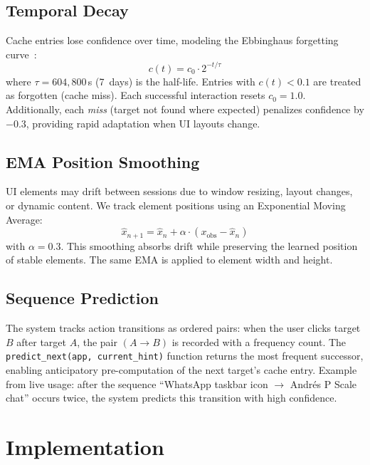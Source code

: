 \documentclass[conference]{IEEEtran}
\begin{document}
\subsection{Temporal Decay}

Cache entries lose confidence over time, modeling the Ebbinghaus forgetting curve~\cite{ebbinghaus1885}:
\begin{equation}
    c(t) = c_0 \cdot 2^{-t / \tau}
    \label{eq:decay}
\end{equation}
where $\tau = 604{,}800$\,s (7~days) is the half-life. Entries with $c(t) < 0.1$ are treated as forgotten (cache miss). Each successful interaction resets $c_0 = 1.0$. Additionally, each \emph{miss} (target not found where expected) penalizes confidence by $-0.3$, providing rapid adaptation when UI layouts change.

\subsection{EMA Position Smoothing}

UI elements may drift between sessions due to window resizing, layout changes, or dynamic content. We track element positions using an Exponential Moving Average:
\begin{equation}
    \hat{x}_{n+1} = \hat{x}_n + \alpha \cdot (x_{\text{obs}} - \hat{x}_n)
    \label{eq:ema}
\end{equation}
with $\alpha = 0.3$. This smoothing absorbs drift while preserving the learned position of stable elements. The same EMA is applied to element width and height.

\subsection{Sequence Prediction}

The system tracks action transitions as ordered pairs: when the user clicks target $B$ after target $A$, the pair $(A \to B)$ is recorded with a frequency count. The \texttt{predict\_next(app, current\_hint)} function returns the most frequent successor, enabling anticipatory pre-computation of the next target's cache entry. Example from live usage: after the sequence ``WhatsApp taskbar icon $\to$ Andr\'{e}s P Scale chat'' occurs twice, the system predicts this transition with high confidence.

\section{Implementation}
\end{document}
